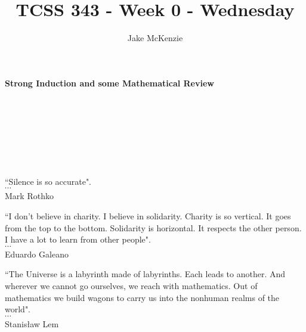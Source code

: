 \documentclass[12pt]{article}
\begin{document}
\title{TCSS 343 - Week 0 - Wednesday}
\author{Jake McKenzie}
\maketitle
\noindent\centerline{\textbf{Strong Induction and some Mathematical Review}}\\\\\\\\\\\\
\begin{center}
    ``Silence is so accurate". \\$\cdots$\\ Mark Rothko
\end{center}
\begin{center}
    ``I don't believe in charity. I believe in solidarity. Charity is so vertical. It goes from the top to the bottom. Solidarity is horizontal. It respects the other person. I have a lot to learn from other people". \\$\cdots$\\ Eduardo Galeano
\end{center}
\begin{center}
    ``The Universe is a labyrinth made of labyrinths. Each leads to another. And wherever we cannot go ourselves, we reach with mathematics. Out of mathematics we build wagons to carry us into the nonhuman realms of the world". \\$\cdots$\\ Stanisław Lem
\end{center}
\newpage
\end{document}
